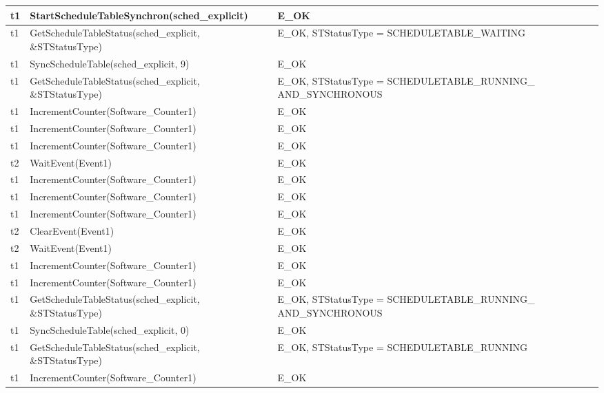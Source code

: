 \documentclass[10pt]{article}
\newlength{\Li}\settowidth{\Li}{Running}
\newlength{\Lii}\setlength{\Lii}{7cm}
\newlength{\Liiii}\setlength{\Liiii}{0.9cm}
\newlength{\Liii}\setlength{\Liii}{\textwidth} \addtolength{\Liii}{-\Li} \addtolength{\Liii}{-\Lii} \addtolength{\Liii}{-\Liiii}
\begin{document}
	\begin{supertabular}{|p{\Li}|p{\Lii}|p{\Liii}|p{\Liiii}|} \hline 
	t1		& StartScheduleTableSynchron(sched\_explicit)					& E\_OK																	& \\ \hline
	t1		& GetScheduleTableStatus(sched\_explicit, \&STStatusType)			& E\_OK, STStatusType = SCHEDULETABLE\_WAITING								& \\ \hline
	t1		& SyncScheduleTable(sched\_explicit, 9)							& E\_OK																	& \\ \hline
	t1		& GetScheduleTableStatus(sched\_explicit, \&STStatusType)			& E\_OK, STStatusType = SCHEDULETABLE\_RUNNING\_ AND\_SYNCHRONOUS		& \\ \hline
	t1		& IncrementCounter(Software\_Counter1)						& E\_OK																	& \\ \hline
	t1		& IncrementCounter(Software\_Counter1)						& E\_OK																	& \\ \hline
	t1		& IncrementCounter(Software\_Counter1)						& E\_OK																	& \\ \hline
	t2		& WaitEvent(Event1)											& E\_OK																	& \\ \hline
	t1		& IncrementCounter(Software\_Counter1)						& E\_OK																	& \\ \hline
	t1		& IncrementCounter(Software\_Counter1)						& E\_OK																	& \\ \hline
	t1		& IncrementCounter(Software\_Counter1)						& E\_OK																	& \\ \hline
	t2		& ClearEvent(Event1)										& E\_OK																	& \\ \hline
	t2		& WaitEvent(Event1)											& E\_OK																	& \\ \hline
	t1		& IncrementCounter(Software\_Counter1)						& E\_OK																	& \\ \hline
	t1		& IncrementCounter(Software\_Counter1)						& E\_OK																	& \\ \hline
	t1		& GetScheduleTableStatus(sched\_explicit, \&STStatusType)			& E\_OK, STStatusType = SCHEDULETABLE\_RUNNING\_ AND\_SYNCHRONOUS		& \\ \hline
	t1		& SyncScheduleTable(sched\_explicit, 0)							& E\_OK																	& \\ \hline
	t1		& GetScheduleTableStatus(sched\_explicit, \&STStatusType)			& E\_OK, STStatusType = SCHEDULETABLE\_RUNNING 							& \\ \hline
	t1		& IncrementCounter(Software\_Counter1)						& E\_OK																	& \\ \hline

\end{supertabular}
\end{document}
